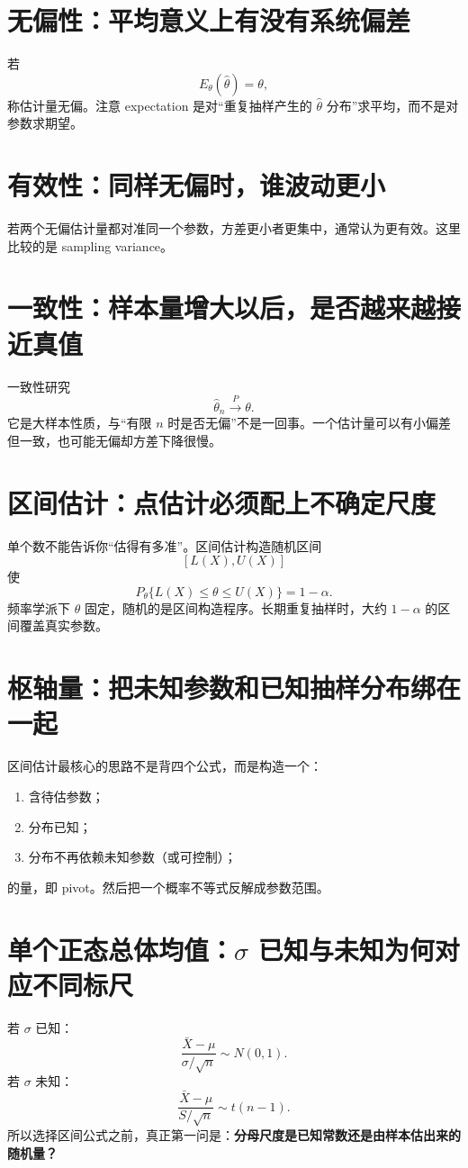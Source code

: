 \documentclass[11pt,a4paper,openany]{ctexbook}
\newcommand{\key}[1]{\textbf{\color{deep}#1}}
\begin{document}
\section{无偏性：平均意义上有没有系统偏差}
若
\[
E_\theta(\hat\theta)=\theta,
\]
称估计量无偏。注意 expectation 是对“重复抽样产生的 $\hat\theta$ 分布”求平均，而不是对参数求期望。

\section{有效性：同样无偏时，谁波动更小}
若两个无偏估计量都对准同一个参数，方差更小者更集中，通常认为更有效。这里比较的是 sampling variance。

\section{一致性：样本量增大以后，是否越来越接近真值}
一致性研究
\[
\hat\theta_n\xrightarrow{P}\theta.
\]
它是大样本性质，与“有限 $n$ 时是否无偏”不是一回事。一个估计量可以有小偏差但一致，也可能无偏却方差下降很慢。

\section{区间估计：点估计必须配上不确定尺度}
单个数不能告诉你“估得有多准”。区间估计构造随机区间
\[
[L(X),U(X)]
\]
使
\[
P_\theta\{L(X)\le\theta\le U(X)\}=1-\alpha.
\]
频率学派下 $\theta$ 固定，随机的是区间构造程序。长期重复抽样时，大约 $1-\alpha$ 的区间覆盖真实参数。

\section{枢轴量：把未知参数和已知抽样分布绑在一起}
区间估计最核心的思路不是背四个公式，而是构造一个：
\begin{enumerate}
  \item 含待估参数；
  \item 分布已知；
  \item 分布不再依赖未知参数（或可控制）；
\end{enumerate}
的量，即 pivot。然后把一个概率不等式反解成参数范围。

\section{单个正态总体均值：\texorpdfstring{$\sigma$}{sigma} 已知与未知为何对应不同标尺}
若 $\sigma$ 已知：
\[
\frac{\bar X-\mu}{\sigma/\sqrt n}\sim N(0,1).
\]
若 $\sigma$ 未知：
\[
\frac{\bar X-\mu}{S/\sqrt n}\sim t(n-1).
\]
所以选择区间公式之前，真正第一问是：\key{分母尺度是已知常数还是由样本估出来的随机量？}
\end{document}
